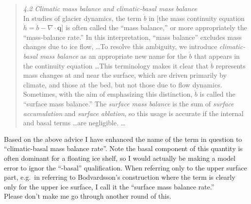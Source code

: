 \documentclass[11pt,reqno]{amsart}
\begin{document}
\begin{itemize}
{\begin{quote}
\emph{4.2 Climatic mass balance and climatic-basal mass balance}
\smallskip \\
In studies of glacier dynamics, the term $\dot b$ in [the mass continuity equation $\dot h = \dot b - \nabla \cdot \mathbf{q}$] is often called the ``mass balance,'' or more appropriately the ``mass-balance rate.''  In this interpretation, ``mass balance'' excludes mass changes due to ice flow, \dots  To resolve this ambiguity, we introduce \emph{climatic-basal mass balance} as an appropriate new name for the $\dot b$ that appears in the continuity equation \dots  This terminology makes it clear that $\dot b$ represents mass changes at and near the surface, which are driven primarily by climate, and those at the bed, but not those due to flow dynamics.
\smallskip \\
Sometimes, with the aim of emphasizing this distinction, $\dot b$ is called the ``surface mass balance.''  The \emph{surface mass balance} is the sum of \emph{surface accumulation} and \emph{surface ablation}, so this usage is accurate if the internal and basal terms \dots are negligible.  \dots
\end{quote} \medskip
Based on the above advice I have enhanced the name of the term in question to ``climatic-basal mass balance rate''.  Note the basal component of this quantity is often dominant for a floating ice shelf, so I would actually be making a model error to ignor the ``-basal'' qualification.  When referring only to the upper surface part, e.g.~in referring to Bodvardsson's construction where the term is clearly only for the upper ice surface, I call it the ``surface mass balance rate.'' \medskip \\
Please don't make me go through another round of this.}

\end{itemize}


%
%
\end{document}
